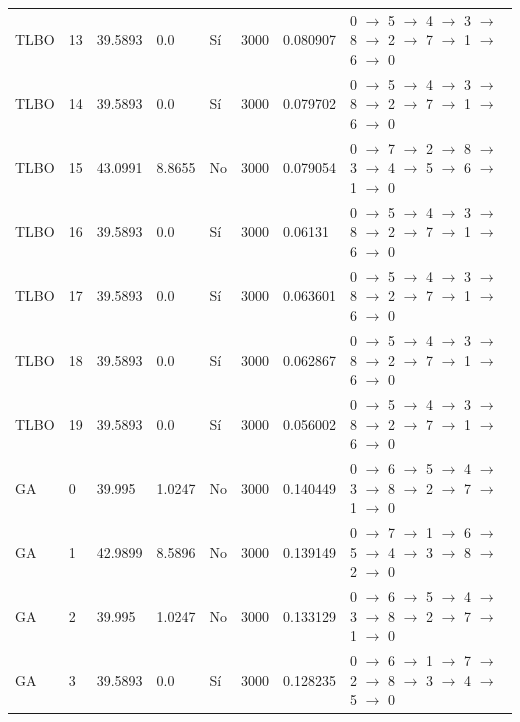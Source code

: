 \begin{table}[htbp]
\begin{tabular}{llllllll}
    TLBO & 13 & 39.5893 & 0.0 & Sí & 3000 & 0.080907 & 0 $\rightarrow$ 5 $\rightarrow$ 4 $\rightarrow$ 3 $\rightarrow$ 8 $\rightarrow$ 2 $\rightarrow$ 7 $\rightarrow$ 1 $\rightarrow$ 6 $\rightarrow$ 0 \\
    TLBO & 14 & 39.5893 & 0.0 & Sí & 3000 & 0.079702 & 0 $\rightarrow$ 5 $\rightarrow$ 4 $\rightarrow$ 3 $\rightarrow$ 8 $\rightarrow$ 2 $\rightarrow$ 7 $\rightarrow$ 1 $\rightarrow$ 6 $\rightarrow$ 0 \\
    TLBO & 15 & 43.0991 & 8.8655 & No & 3000 & 0.079054 & 0 $\rightarrow$ 7 $\rightarrow$ 2 $\rightarrow$ 8 $\rightarrow$ 3 $\rightarrow$ 4 $\rightarrow$ 5 $\rightarrow$ 6 $\rightarrow$ 1 $\rightarrow$ 0 \\
    TLBO & 16 & 39.5893 & 0.0 & Sí & 3000 & 0.06131 & 0 $\rightarrow$ 5 $\rightarrow$ 4 $\rightarrow$ 3 $\rightarrow$ 8 $\rightarrow$ 2 $\rightarrow$ 7 $\rightarrow$ 1 $\rightarrow$ 6 $\rightarrow$ 0 \\
    TLBO & 17 & 39.5893 & 0.0 & Sí & 3000 & 0.063601 & 0 $\rightarrow$ 5 $\rightarrow$ 4 $\rightarrow$ 3 $\rightarrow$ 8 $\rightarrow$ 2 $\rightarrow$ 7 $\rightarrow$ 1 $\rightarrow$ 6 $\rightarrow$ 0 \\
    TLBO & 18 & 39.5893 & 0.0 & Sí & 3000 & 0.062867 & 0 $\rightarrow$ 5 $\rightarrow$ 4 $\rightarrow$ 3 $\rightarrow$ 8 $\rightarrow$ 2 $\rightarrow$ 7 $\rightarrow$ 1 $\rightarrow$ 6 $\rightarrow$ 0 \\
    TLBO & 19 & 39.5893 & 0.0 & Sí & 3000 & 0.056002 & 0 $\rightarrow$ 5 $\rightarrow$ 4 $\rightarrow$ 3 $\rightarrow$ 8 $\rightarrow$ 2 $\rightarrow$ 7 $\rightarrow$ 1 $\rightarrow$ 6 $\rightarrow$ 0 \\
    GA & 0 & 39.995 & 1.0247 & No & 3000 & 0.140449 & 0 $\rightarrow$ 6 $\rightarrow$ 5 $\rightarrow$ 4 $\rightarrow$ 3 $\rightarrow$ 8 $\rightarrow$ 2 $\rightarrow$ 7 $\rightarrow$ 1 $\rightarrow$ 0 \\
    GA & 1 & 42.9899 & 8.5896 & No & 3000 & 0.139149 & 0 $\rightarrow$ 7 $\rightarrow$ 1 $\rightarrow$ 6 $\rightarrow$ 5 $\rightarrow$ 4 $\rightarrow$ 3 $\rightarrow$ 8 $\rightarrow$ 2 $\rightarrow$ 0 \\
    GA & 2 & 39.995 & 1.0247 & No & 3000 & 0.133129 & 0 $\rightarrow$ 6 $\rightarrow$ 5 $\rightarrow$ 4 $\rightarrow$ 3 $\rightarrow$ 8 $\rightarrow$ 2 $\rightarrow$ 7 $\rightarrow$ 1 $\rightarrow$ 0 \\
    GA & 3 & 39.5893 & 0.0 & Sí & 3000 & 0.128235 & 0 $\rightarrow$ 6 $\rightarrow$ 1 $\rightarrow$ 7 $\rightarrow$ 2 $\rightarrow$ 8 $\rightarrow$ 3 $\rightarrow$ 4 $\rightarrow$ 5 $\rightarrow$ 0 \\

\end{tabular}
\end{table}
